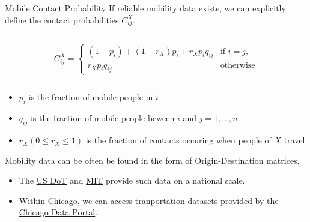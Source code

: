 \begin{slide}{Mobile Contact Probability}
If reliable mobility data exists, we can explicitly define the contact probabilities $C_{ij}^X$.
\vfill
\begin{columns}[T]
\begin{column}{.7\textwidth}
	\begin{definition}
		$$ C_{ij}^X =
		\begin{cases}
			(1 - p_i) + (1 - r_X) p_i + r_X p_i q_{ij}	&	\text{if } i = j, \\
			r_X p_i q_{ij}					&	\text{otherwise}
		\end{cases} $$
	\end{definition}
\end{column}
\end{columns}
\vfill
\begin{itemize}
	\item $p_i$ is the fraction of mobile people in $i$
	\item $q_{ij}$ is the fraction of mobile people beween $i$ and $j=1, \dots , n$
	\item $r_X (0 \leq r_X \leq 1)$ is the fraction of contacts occuring when people of $X$ travel
\end{itemize}
\vfill
Mobility data can be often be found in the form of Origin-Destination matrices.
\begin{itemize}
	\item The \href{https://www.bts.gov/topics/airlines-and-airports/origin-and-destination-survey-data}{US DoT} and \href{https://libguides.mit.edu/gis}{MIT}
	provide such data on a national scale.
	\item Within Chicago, we can access tranportation datasets provided by the \href{https://data.cityofchicago.org/browse?category=Transportation&page=1}{Chicago Data Portal}.
\end{itemize}


\end{slide}